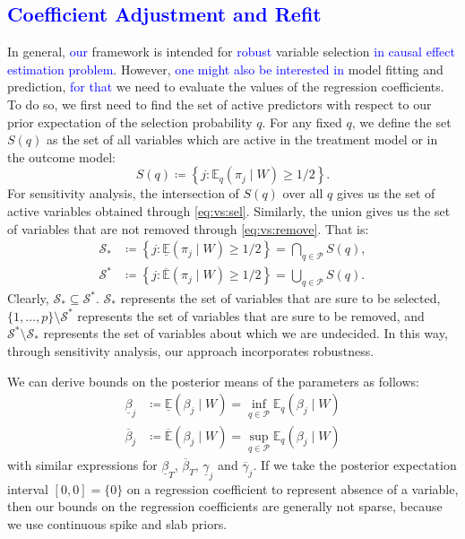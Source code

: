\documentclass[preprint,12pt]{elsarticle}
\newcommand{\lexp}{\underline{\mathbb{E}}}
\newcommand{\uexp}{\overline{\mathbb{E}}}
\newcommand{\added}[1]{\textcolor{blue}{#1}}
\begin{document}
\subsection{\added{Coefficient Adjustment and Refit}}
In general, \added{our} framework is
intended
for \added{robust} variable selection \added{in causal effect estimation problem}. However, \added{one might also be interested in}
model fitting and prediction, \added{for that} we need to evaluate the values 
of the regression coefficients. To do so, we first need to find the set of active
predictors with respect to our prior expectation of the selection probability $q$.
For any fixed $q$, we define the set $S(q)$ as the set of all variables which are active
in the treatment model or in the outcome model:
\begin{equation}
	S(q)\coloneqq
	\left\{j\colon \mathbb{E}_q(\pi_j\mid W) \ge 1/2\right\}.
\end{equation}
For sensitivity analysis,
the intersection of $S(q)$ over all $q$ gives us the set of
active variables obtained through \cref{eq:vs:sel}.
Similarly, the union gives us the set of
variables that are not removed through \cref{eq:vs:remove}.
That is:
\begin{align}
    \mathcal{S}_*&\coloneqq \left\{j:\lexp (\pi_j\mid W)\ge1/2\right\}
    = \bigcap_{q\in \mathcal{P}}S(q), \\
    \mathcal{S}^*&\coloneqq \left\{j:\uexp (\pi_j\mid W)\ge1/2\right\}
    = \bigcup_{q\in \mathcal{P}}S(q).
\end{align}
Clearly, $\mathcal{S}_*\subseteq\mathcal{S}^*$.
$\mathcal{S}_*$ represents the set of variables that are sure to be selected,
$\{1,\dots,p\}\setminus\mathcal{S}^*$ represents the set of variables that are sure to be removed, and
$\mathcal{S}^*\setminus\mathcal{S}_*$ represents the set of variables about which we are undecided.
In this way, through sensitivity analysis, our approach incorporates robustness.

We can derive bounds on the posterior means of the parameters as follows:
\begin{align}
\label{eq:beta:lower}
\underline{\beta}_j&\coloneqq\lexp (\beta_j\mid W)= \inf_{q\in \mathcal{P}} \mathbb{E}_q(\beta_j\mid W) \\
\label{eq:beta:upper}
\overline{\beta}_j&\coloneqq\uexp (\beta_j\mid W)=\sup_{q\in \mathcal{P}} \mathbb{E}_q(\beta_j\mid W)
\end{align}
with similar expressions for 
$\underline{\beta}_T$, $\overline{\beta}_T$,
$\underline{\gamma}_j$ and $\overline{\gamma}_j$.
If we take the posterior expectation interval $[0,0]=\{0\}$ on a regression coefficient to represent absence of a variable, then our bounds on the regression coefficients are generally not sparse, because we use continuous 
spike and slab priors.
\end{document}

